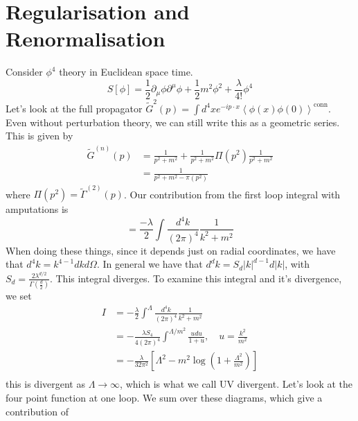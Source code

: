 \documentclass[11pt, oneside]{article}   	%
\theoremstyle{slanted}
\begin{document}
\section{Regularisation and Renormalisation}%
\label{sec:regularisation_and_renormalisation}
Consider $ \phi ^ 4 $ theory
in Euclidean space time. 
\[
S\left[  \phi   \right]  = \frac{1}{2 } \partial  _ \mu \phi \partial  ^ \mu \phi 
+ \frac{1}{2 } m ^ 2 \phi ^ 2 + \frac{\lambda }{ 4 ! } \phi ^ 4 
\] Let's look at the full propagator $ \tilde{ G } ^ 2 \left( p  \right)  
= \int d ^ 4 x e ^{  - i p \cdot  x } \left< \phi \left( x  \right)  \phi \left( 0  \right)   \right> 
^{ \text{conn}}$. Even without 
perturbation theory, we 
can still write this as a geometric series. 
This is given by 
\begin{align*}
\tilde{ G } ^{ \left( n  \right)  } \left( p  \right)  
&=  \frac{1}{p ^ 2 + m ^ 2  } + \frac{1}{p ^ 2 + m ^ 2 }\Pi \left( p ^ 2  \right)  
\frac{1}{p ^ 2+ m ^ 2 } \\
&=  \frac{1}{p ^ 2 + m ^ 2  - \pi \left( p ^ 2  \right) } 
\end{align*} where $ \Pi \left( p ^ 2  \right)   = \tilde{ \Gamma } ^{ \left( 2  \right)   }
\left( p  \right)  $. 
Our contribution 
from the first loop integral with amputations 
is 
\[
= \frac{ - \lambda}{ 2 } \int \frac{ d ^ 4 k }{ \left( 2 \pi  \right)  ^ 4 } 
\frac{1}{k ^ 2 + m ^ 2 }
\] When doing these things, 
since it depends just on radial coordinates, 
we have that $ d ^ 4 k  = k ^{ 4  - 1 } dk d \Omega $. 
In general we have that 
$ d ^ d k  =  S_ d | k | ^{ d - 1 } d | k | $, 
with $ S _ d  = \frac{ 2 \lambda ^{ d / 2 } }{ \Gamma \left( \frac{d}{ 2  }  \right)  } $. 
This integral diverges. 
To examine this integral and it's divergence, 
we set 
\begin{align*}
I  &=   - \frac{\lambda }{ 2 } \int ^ \Lambda 
\frac{ d ^ 4 k }{ \left( 2 \pi  \right)  ^ 4 } \frac{1}{ k ^ 2 + m ^ 2 } \\ 
&=  - \frac{\lambda S _ 4  }{ 4 \left( 2 \pi  \right)  ^ 4 } 
\int ^{ \Lambda / m ^ 2 } \frac{u d u }{ 1 + u }, \quad u  = \frac{k ^2}{m ^ 2 } \\
&=  - \frac{\lambda }{ 32 \pi ^ 2 } \left[  
\Lambda ^ 2  - m ^ 2 \log \left( 1 + \frac{\Lambda ^ 2 }{ m ^ 2 }  \right) \right]  \\
\end{align*} this 
is divergent as $\Lambda \to \infty $, which 
is what we call UV divergent. 
Let's look at the 
four point function at one loop. 
We sum over these diagrams, 
which give a contribution of 
\end{document}
